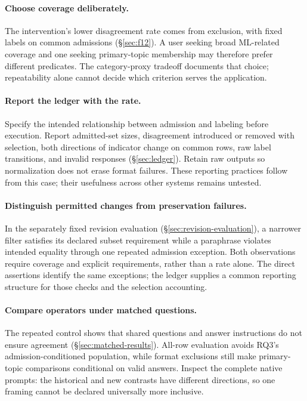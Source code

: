 \documentclass[11pt]{article}
\begin{document}
\paragraph{Choose coverage deliberately.}
The intervention's lower disagreement rate comes from exclusion, with fixed
labels on common admissions (\S\ref{sec:f12}). A user seeking broad ML-related
coverage and one seeking primary-topic membership may therefore prefer
different predicates. The category-proxy tradeoff documents that choice;
repeatability alone cannot decide which criterion serves the application.

\paragraph{Report the ledger with the rate.}
Specify the intended relationship between admission and labeling before
execution. Report admitted-set sizes, disagreement introduced or removed with
selection, both directions of indicator change on common rows, raw label
transitions, and invalid responses (\S\ref{sec:ledger}). Retain raw outputs so
normalization does not erase format failures. These reporting practices follow
from this case; their usefulness across other systems remains untested.

\paragraph{Distinguish permitted changes from preservation failures.}
In the separately fixed revision evaluation
(\S\ref{sec:revision-evaluation}), a narrower filter satisfies its declared
subset requirement while a paraphrase violates intended equality through one
repeated admission exception. Both observations require coverage and explicit
requirements, rather than a rate alone. The direct assertions identify the
same exceptions; the ledger supplies a common reporting structure for those
checks and the selection accounting.

\paragraph{Compare operators under matched questions.}
The repeated control shows that shared questions and answer instructions do
not ensure agreement (\S\ref{sec:matched-results}). All-row evaluation avoids
RQ3's admission-conditioned population, while format exclusions still make
primary-topic comparisons conditional on valid answers. Inspect the complete
native prompts: the historical and new contrasts have different directions,
so one framing cannot be declared universally more inclusive.
\end{document}
